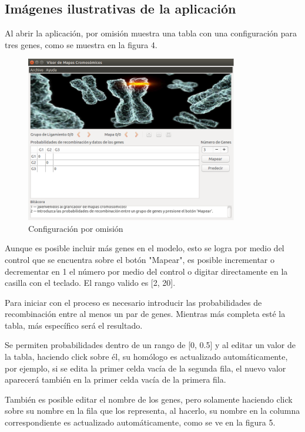 \documentclass{article}
\begin{document}
	
	
	\subsection{Imágenes ilustrativas de la aplicación}
	
	Al abrir la aplicación, por omisión muestra una tabla con una configuración para tres genes, como se muestra en la figura 4. 
	
	\begin{figure}[h!]
		\centering
			\includegraphics[width=350px, keepaspectratio=false]{report1}
				\caption{Configuración por omisión}
	\end{figure}
	
	Aunque es posible incluir más genes en el modelo, esto se logra por medio del control que se encuentra sobre el botón "Mapear", es posible incrementar o decrementar en 1 el número por medio del control o digitar directamente en la casilla con el teclado. El rango valido es [2, 20].
	
	Para iniciar con el proceso es necesario introducir las probabilidades de recombinación entre al menos un par de genes. Mientras más completa esté la tabla, más específico será el resultado.
	
	Se permiten probabilidades dentro de un rango de [0, 0.5] y al editar un valor de la tabla, haciendo click sobre él, su homólogo es actualizado automáticamente, por ejemplo, si se edita la primer celda vacía de la segunda fila, el nuevo valor aparecerá también en la primer celda vacía de la primera fila.
	
	También es posible editar el nombre de los genes, pero solamente haciendo click sobre su nombre en la fila que los representa, al hacerlo, su nombre en la columna correspondiente es actualizado automáticamente, como se ve en la figura 5.
	
\end{document}
